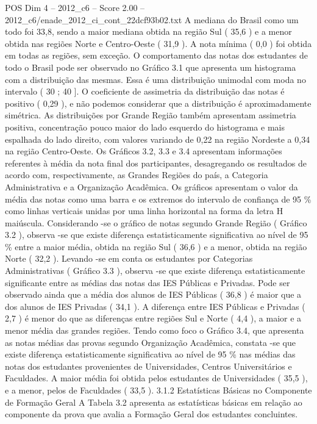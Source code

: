 \begin{textsample}{POS Dim 4 – 2012\_c6 – Score 2.00 – 2012\_c6/enade\_2012\_ci\_cont\_22dcf93b02.txt}
A mediana do Brasil como um todo foi 33,8, sendo a maior mediana obtida na região Sul ( 35,6 ) e a menor obtida nas regiões Norte e Centro-Oeste ( 31,9 ).
A nota mínima ( 0,0 ) foi obtida em todas as regiões, sem exceção.
O comportamento das notas dos estudantes de todo o Brasil pode ser observado no Gráfico 3.1 que apresenta um histograma com a distribuição das mesmas.
Essa é uma distribuição unimodal com moda no intervalo ( 30 ; 40 ].
O coeficiente de assimetria da distribuição das notas é positivo ( 0,29 ), e não podemos considerar que a distribuição é aproximadamente simétrica.
As distribuições por Grande Região também apresentam assimetria positiva, concentração pouco maior do lado esquerdo do histograma e mais espalhada do lado direito, com valores variando de 0,22 na região Nordeste a 0,34 na região Centro-Oeste.
Os Gráficos 3.2, 3.3 e 3.4 apresentam informações referentes à média da nota final dos participantes, desagregando os resultados de acordo com, respectivamente, as Grandes Regiões do país, a Categoria Administrativa e a Organização Acadêmica.
Os gráficos apresentam o valor da média das notas como uma barra e os extremos do intervalo de confiança de 95 \% como linhas verticais unidas por uma linha horizontal na forma da letra H maiúscula.
Considerando -se o gráfico de notas segundo Grande Região ( Gráfico 3.2 ), observa -se que existe diferença estatisticamente significativa ao nível de 95 \% entre a maior média, obtida na região Sul ( 36,6 ) e a menor, obtida na região Norte ( 32,2 ).
Levando -se em conta os estudantes por Categorias Administrativas ( Gráfico 3.3 ), observa -se que existe diferença estatisticamente significante entre as médias das notas das IES Públicas e Privadas.
Pode ser observado ainda que a média dos alunos de IES Públicas ( 36,8 ) é maior que a dos alunos de IES Privadas ( 34,1 ).
A diferença entre IES Públicas e Privadas ( 2,7 ) é menor do que as diferenças entre regiões Sul e Norte ( 4,4 ), a maior e a menor média das grandes regiões.
Tendo como foco o Gráfico 3.4, que apresenta as notas médias das provas segundo Organização Acadêmica, constata -se que existe diferença estatisticamente significativa ao nível de 95 \% nas médias das notas dos estudantes provenientes de Universidades, Centros Universitários e Faculdades.
A maior média foi obtida pelos estudantes de Universidades ( 35,5 ), e a menor, pelos de Faculdades ( 33,5 ). 3.1.2 Estatísticas Básicas no Componente de Formação Geral A Tabela 3.2 apresenta as estatísticas básicas em relação ao componente da prova que avalia a Formação Geral dos estudantes concluintes.

\end{textsample}
